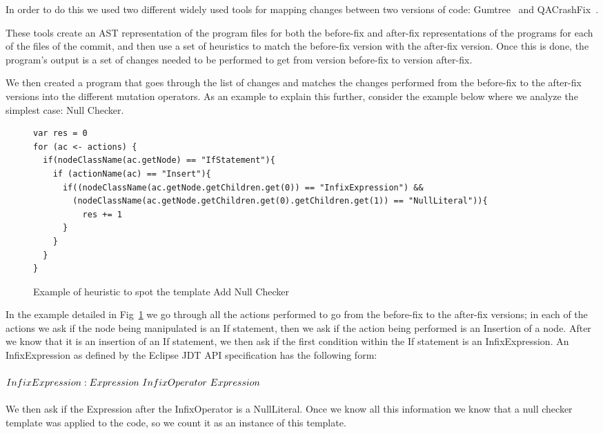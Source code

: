 \documentclass[conference]{IEEEtran}
\newcommand{\ra}[1]{\renewcommand{\arraystretch}{#1}}
\begin{document}
In order to do this we used two different widely used tools for mapping changes 
between two versions of code: Gumtree~\cite{falleri14} and QACrashFix~\cite{gao15}.

These tools create an AST representation of the program files for both the 
before-fix and after-fix representations of the programs for each of the files 
of the commit, and then use a set of heuristics to match the before-fix version 
with the after-fix version. Once this is done, the program's output is a set of 
changes needed to be performed to get from version before-fix to version 
after-fix.

We then created a program that goes through the list of changes and matches the changes performed from the before-fix to the after-fix versions into the different mutation operators. As an example to explain this further, consider the example below where we analyze the simplest case: Null Checker.



\begin{figure}%
  \centering
\ra{1.3}

\begin{verbatim}
var res = 0
for (ac <- actions) {
  if(nodeClassName(ac.getNode) == "IfStatement"){
    if (actionName(ac) == "Insert"){
      if((nodeClassName(ac.getNode.getChildren.get(0)) == "InfixExpression") && 
        (nodeClassName(ac.getNode.getChildren.get(0).getChildren.get(1)) == "NullLiteral")){
          res += 1
      }
    }
  }
}
\end{verbatim}
\caption{Example of heuristic to spot the template Add Null Checker}\label{fig:codeSnippet}
\end{figure}






In the example detailed in Fig~\ref{fig:codeSnippet} we go through all the actions performed to go from the before-fix to the after-fix versions; in each of the actions we ask if the node being manipulated is an If statement, then we ask if the action being performed is an Insertion of a node. After we know that it is an insertion of an If statement, we then ask if the first condition within the If statement is an InfixExpression. An InfixExpression as defined by the Eclipse JDT API specification has the following form:
\\
\\
$InfixExpression: \\
Expression~InfixOperator~Expression
$
\\
\\  
We then ask if the Expression after the InfixOperator is a NullLiteral. Once we know all this information we know that a null checker template was applied to the code, so we count it as an instance of this template.
\end{document}
